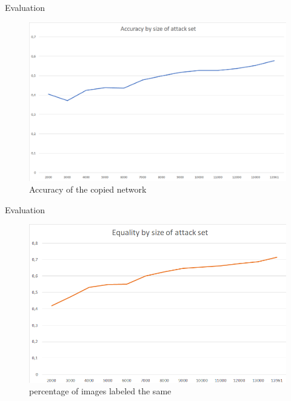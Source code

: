 \documentclass[10pt]{beamer}
\begin{document}
\begin{frame}[fragile]{Evaluation}
           \begin{figure}[h!]
                    \centering      \includegraphics[scale=0.8]{exercise_3/paper/images/accuracy_copy_Azure.png}
                    \caption{Accuracy of the copied network}
                    \label{fig:Ac_Azure}
            \end{figure}
        
\end{frame}
\begin{frame}[fragile]{Evaluation}
           \begin{figure}[h!]
                    \centering      \includegraphics[scale=0.8]{exercise_3/paper/images/equality_copy_Azure.png}
                    \caption{percentage of images labeled the same}
                    \label{fig:Eq_AZure}
            \end{figure}
        
\end{frame}
\end{document}
